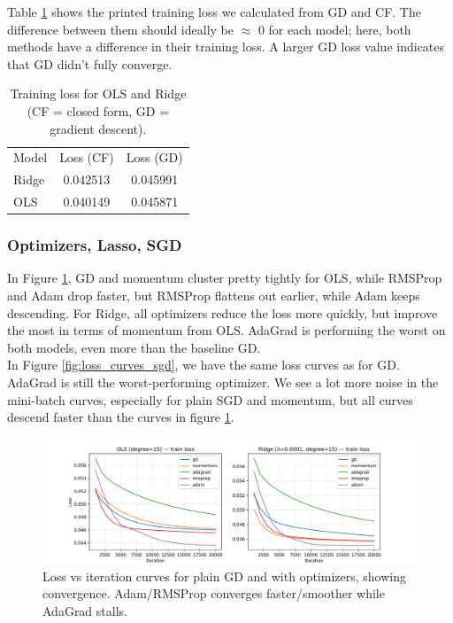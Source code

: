 \documentclass[amssymb,twocolumn,aps,floatfix]{revtex4-2}
\begin{document}
Table \ref{tab:train-ols-ridge} shows the printed training loss we calculated from GD and CF. The difference between them should ideally be $\approx$ 0 for each model; here, both methods have a difference in their training loss. A larger GD loss value indicates that GD didn't fully converge.  

\begin{table}[h!]
\caption{Training loss for OLS and Ridge (CF = closed form, GD = gradient descent).}
\label{tab:train-ols-ridge}
\begin{ruledtabular}
\begin{tabular}{lcc}
Model & Loss (CF) & Loss (GD) \\
\colrule
Ridge & 0.042513 & 0.045991 \\
OLS   & 0.040149 & 0.045871 \\
\end{tabular}
\end{ruledtabular}
\end{table}



\subsubsection{Optimizers, Lasso, SGD}

In Figure \ref{fig:loss_curves_gd}, GD and momentum cluster pretty tightly for OLS, while RMSProp and Adam drop faster, but RMSProp flattens out earlier, while Adam keeps descending. For Ridge, all optimizers reduce the loss more quickly, but improve the most in terms of momentum from OLS. AdaGrad is performing the worst on both models, even more than the baseline GD. \\

In Figure \ref{fig:loss_curves_sgd}, we have the same loss curves as for GD. AdaGrad is still the worst-performing optimizer. We see a lot more noise in the mini-batch curves, especially for plain SGD and momentum, but all curves descend faster than the curves in figure \ref{fig:loss_curves_gd}. 

\begin{figure}[t]
    \centering
    \includegraphics[width=1\linewidth]{Project-1/Figures/Part_c_d_e_f_GD_optimizers_loss_curves.png}
    \caption{Loss vs iteration curves for plain GD and with optimizers, showing convergence. Adam/RMSProp converges faster/smoother while AdaGrad stalls.}
    \label{fig:loss_curves_gd}
\end{figure}
\end{document}
